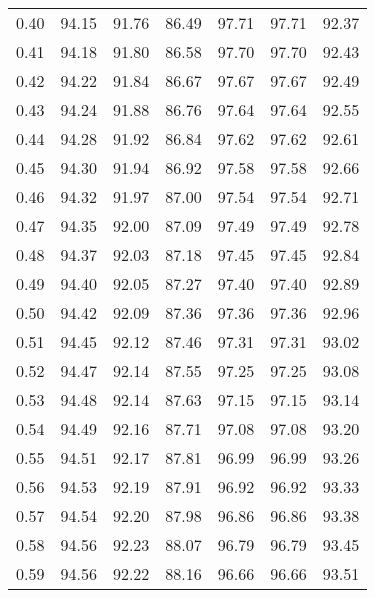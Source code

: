 \begin{tabular}{|c|c|c|c|c|c|c|}
      0.40 &     94.15 &     91.76 &      86.49 &   97.71 &      97.71 &         92.37 \\
      0.41 &     94.18 &     91.80 &      86.58 &   97.70 &      97.70 &         92.43 \\
      0.42 &     94.22 &     91.84 &      86.67 &   97.67 &      97.67 &         92.49 \\
      0.43 &     94.24 &     91.88 &      86.76 &   97.64 &      97.64 &         92.55 \\
      0.44 &     94.28 &     91.92 &      86.84 &   97.62 &      97.62 &         92.61 \\
      0.45 &     94.30 &     91.94 &      86.92 &   97.58 &      97.58 &         92.66 \\
      0.46 &     94.32 &     91.97 &      87.00 &   97.54 &      97.54 &         92.71 \\
      0.47 &     94.35 &     92.00 &      87.09 &   97.49 &      97.49 &         92.78 \\
      0.48 &     94.37 &     92.03 &      87.18 &   97.45 &      97.45 &         92.84 \\
      0.49 &     94.40 &     92.05 &      87.27 &   97.40 &      97.40 &         92.89 \\
      0.50 &     94.42 &     92.09 &      87.36 &   97.36 &      97.36 &         92.96 \\
      0.51 &     94.45 &     92.12 &      87.46 &   97.31 &      97.31 &         93.02 \\
      0.52 &     94.47 &     92.14 &      87.55 &   97.25 &      97.25 &         93.08 \\
      0.53 &     94.48 &     92.14 &      87.63 &   97.15 &      97.15 &         93.14 \\
      0.54 &     94.49 &     92.16 &      87.71 &   97.08 &      97.08 &         93.20 \\
      0.55 &     94.51 &     92.17 &      87.81 &   96.99 &      96.99 &         93.26 \\
      0.56 &     94.53 &     92.19 &      87.91 &   96.92 &      96.92 &         93.33 \\
      0.57 &     94.54 &     92.20 &      87.98 &   96.86 &      96.86 &         93.38 \\
      0.58 &     94.56 &     92.23 &      88.07 &   96.79 &      96.79 &         93.45 \\
      0.59 &     94.56 &     92.22 &      88.16 &   96.66 &      96.66 &         93.51 \\

\end{tabular}
